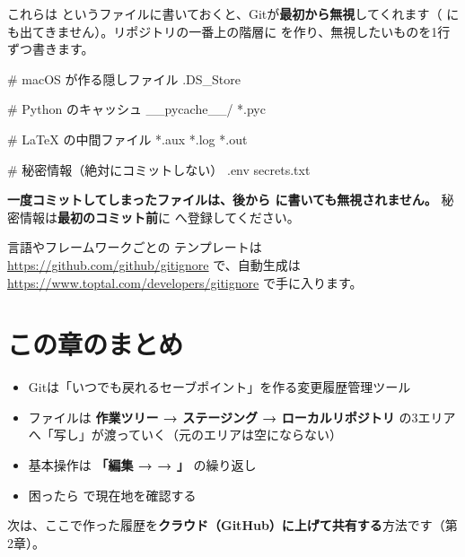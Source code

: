 これらは  というファイルに書いておくと、Gitが\textbf{最初から無視}してくれます（ にも出てきません）。リポジトリの一番上の階層に  を作り、無視したいものを1行ずつ書きます。

\begin{codebox}[text]
\begin{code}
# macOS が作る隠しファイル
.DS_Store

# Python のキャッシュ
__pycache__/
*.pyc

# LaTeX の中間ファイル
*.aux
*.log
*.out

# 秘密情報（絶対にコミットしない）
.env
secrets.txt
\end{code}
\end{codebox}

\begin{warnbox}
\textbf{一度コミットしてしまったファイルは、後から  に書いても無視されません。} 秘密情報は\textbf{最初のコミット前}に  へ登録してください。
\end{warnbox}

\begin{hintbox}
言語やフレームワークごとの  テンプレートは \url{https://github.com/github/gitignore} で、自動生成は \url{https://www.toptal.com/developers/gitignore} で手に入ります。
\end{hintbox}

\section*{この章のまとめ}

\begin{itemize}[leftmargin=1.4em]
  \item Gitは「いつでも戻れるセーブポイント」を作る変更履歴管理ツール
  \item ファイルは \textbf{作業ツリー → ステージング → ローカルリポジトリ} の3エリアへ「写し」が渡っていく（元のエリアは空にならない）
  \item 基本操作は \textbf{「編集 →  → 」} の繰り返し
  \item 困ったら  で現在地を確認する
\end{itemize}

次は、ここで作った履歴を\textbf{クラウド（GitHub）に上げて共有する}方法です（第2章）。
